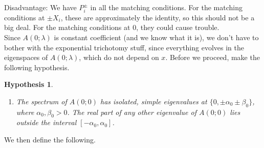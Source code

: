 \documentclass[12pt]{article}
\newtheorem{hypothesis}{Hypothesis}
\begin{document}
Disadvantage: We have $P_i^\pm$ in all the matching conditions. For the matching conditions at $\pm X_i$, these are approximately the identity, so this should not be a big deal. For the matching conditions at 0, they could cause trouble.\\

Since $A(0; \lambda)$ is constant coefficient (and we know what it is), we don't have to bother with the exponential trichotomy stuff, since everything evolves in the eigenspaces of $A(0; \lambda)$, which do not depend on $x$. Before we proceed, make the following hypothesis.

\begin{hypothesis}\label{Aspectrumhyp}
\begin{enumerate}
	\item The spectrum of $A(0; 0)$ has isolated, simple eigenvalues at $\{ 0, \pm \alpha_0 \pm \beta_0 \}$, where $\alpha_0, \beta_0 > 0$. The real part of any other eigenvalue of $A(0; 0)$ lies outside the interval $[-\alpha_0, \alpha_0]$.
\end{enumerate}
\end{hypothesis}

We then define the following.
\end{document}
